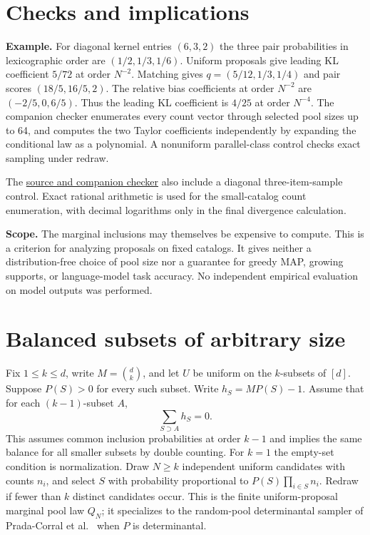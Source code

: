 \documentclass[11pt]{article}
\begin{document}
\newpage
\section{Checks and implications}
\textbf{Example.} For diagonal kernel entries $(6,3,2)$ the three pair probabilities in lexicographic order are $(1/2,1/3,1/6)$. Uniform proposals give leading KL coefficient $5/72$ at order $N^{-2}$. Matching gives $q=(5/12,1/3,1/4)$ and pair scores $(18/5,16/5,2)$. The relative bias coefficients at order $N^{-2}$ are $(-2/5,0,6/5)$. Thus the leading KL coefficient is $4/25$ at order $N^{-4}$. The companion checker enumerates every count vector through selected pool sizes up to 64, and computes the two Taylor coefficients independently by expanding the conditional law as a polynomial. A nonuniform parallel-class control checks exact sampling under redraw.

The \href{https://github.com/lluiseriksson/THE-ERIKSSON-PROGRAMME/tree/codex/pool-bias-20261120/audits/pool-dpp}{source and companion checker} also include a diagonal three-item-sample control. Exact rational arithmetic is used for the small-catalog count enumeration, with decimal logarithms only in the final divergence calculation.

\textbf{Scope.} The marginal inclusions may themselves be expensive to compute. This is a criterion for analyzing proposals on fixed catalogs. It gives neither a distribution-free choice of pool size nor a guarantee for greedy MAP, growing supports, or language-model task accuracy. No independent empirical evaluation on model outputs was performed.

\newpage
\section{Balanced subsets of arbitrary size}
Fix $1\leq k\leq d$, write $M=\binom dk$, and let $U$ be uniform on the $k$-subsets of $[d]$. Suppose $P(S)>0$ for every such subset. Write $h_S=MP(S)-1$. Assume that for each $(k-1)$-subset $A$,
\[
                 \sum_{S\supset A} h_S=0.
\]
This assumes common inclusion probabilities at order $k-1$ and implies the same balance for all smaller subsets by double counting. For $k=1$ the empty-set condition is normalization. Draw $N\ge k$ independent uniform candidates with counts $n_i$, and select $S$ with probability proportional to $P(S)\prod_{i\in S}n_i$. Redraw if fewer than $k$ distinct candidates occur. This is the finite uniform-proposal marginal pool law $Q_N$; it specializes to the random-pool determinantal sampler of Prada-Corral et al.\ \cite{pool} when $P$ is determinantal.
\end{document}
